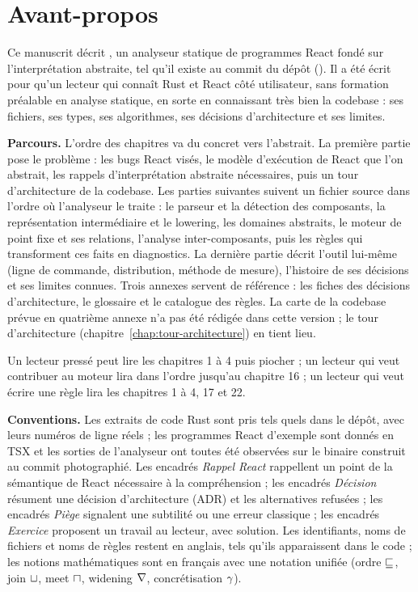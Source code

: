 \chapter*{Avant-propos}

Ce manuscrit décrit \reactant{}, un analyseur statique de programmes React
fondé sur l'interprétation abstraite, tel qu'il existe au commit
\snapshotCommit{} du dépôt (\snapshotDate). Il a été écrit pour qu'un lecteur
qui connaît Rust et React côté utilisateur, sans formation préalable en analyse
statique, en sorte en connaissant très bien la codebase : ses fichiers, ses
types, ses algorithmes, ses décisions d'architecture et ses limites.

\medskip

\noindent\textbf{Parcours.} L'ordre des chapitres va du concret vers
l'abstrait. La première partie pose le problème : les bugs React visés, le
modèle d'exécution de React que l'on abstrait, les rappels d'interprétation
abstraite nécessaires, puis un tour d'architecture de la codebase. Les parties
suivantes suivent un fichier source dans l'ordre où l'analyseur le traite : le
parseur et la détection des composants, la représentation intermédiaire et le
lowering, les domaines abstraits, le moteur de point fixe et ses relations,
l'analyse inter-composants, puis les règles qui transforment ces faits en
diagnostics. La dernière partie décrit l'outil lui-même (ligne de commande,
distribution, méthode de mesure), l'histoire de ses décisions et ses limites
connues. Trois annexes servent de référence : les fiches des décisions
d'architecture, le glossaire et le catalogue des règles. La carte de la
codebase prévue en quatrième annexe n'a pas été rédigée dans cette version ; le
tour d'architecture (chapitre~\ref{chap:tour-architecture}) en tient lieu.

Un lecteur pressé peut lire les chapitres 1 à 4 puis piocher ; un lecteur qui
veut contribuer au moteur lira dans l'ordre jusqu'au chapitre 16 ; un lecteur
qui veut écrire une règle lira les chapitres 1 à 4, 17 et 22.

\medskip

\noindent\textbf{Conventions.} Les extraits de code Rust sont pris tels quels
dans le dépôt, avec leurs numéros de ligne réels ; les programmes React
d'exemple sont donnés en TSX et les sorties de l'analyseur ont toutes été
observées sur le binaire construit au commit photographié. Les encadrés
\emph{Rappel React} rappellent un point de la sémantique de React nécessaire à
la compréhension ; les encadrés \emph{Décision} résument une décision
d'architecture (ADR) et les alternatives refusées ; les encadrés \emph{Piège}
signalent une subtilité ou une erreur classique ; les encadrés
\emph{Exercice} proposent un travail au lecteur, avec solution. Les
identifiants, noms de fichiers et noms de règles restent en anglais, tels qu'ils
apparaissent dans le code ; les notions mathématiques sont en français avec une
notation unifiée (ordre $\sqsubseteq$, join $\sqcup$, meet $\sqcap$, widening $\mathbin{\nabla}$,
concrétisation $\gamma$).


